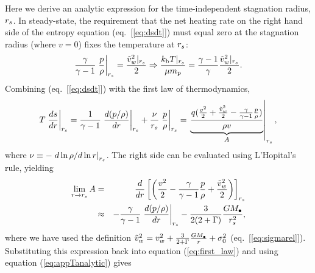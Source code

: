 Here we derive an analytic expression for the time-independent stagnation radius, $r_s$.  In steady-state, the requirement that the net heating rate on the right hand side of the entropy equation (eq.~[\ref{eq:dsdt}]) 
must equal zero at the stagnation radius (where $v = 0$) fixes the temperature at $r_s$:
\begin{align}
 \frac{\gamma}{\gamma-1} \left.\frac{p}{\rho}\right|_{r_s}=\frac{\tilde{v}_{w}^{2}|_{r_s}}{2} \Rightarrow \frac{k_{\rm b} T|_{r_s}}{\mu m_{\rm p}}=\frac{\gamma-1}{\gamma} \frac{\tilde{v}_{w}^{2}|_{r_s}}{2} .
\label{eq:appTanalytic}
\end{align}
Combining (eq.~[\ref{eq:dsdt}]) with the first law of thermodynamics,
\begin{align}
T\left.\frac{d s}{d r}\right|_{r_s} = \frac{1}{\gamma-1}\left.\frac{d (p/\rho)}{d r}\right|_{r_s}+\frac{\nu}{r_s}  \left.\frac{p}{\rho}\right|_{r_s}=\left.\underbrace{\frac{q (\frac{v^2}{2}+\frac{\tilde{v}_{w}^2}{2}-\frac{\gamma}{\gamma-1} \frac{p}{\rho})}{\rho  v}}_{A}\right|_{r_s}, 
 \label{eq:first_law}
\end{align}
where $\nu\equiv -\left.d\ln\rho/d\ln r\right|_{r_s}$.  The right side can be evaluated using L'Hopital's rule, yielding
\begin{align}
  \lim_{r \rightarrow r_s} A &=& \frac{d}{dr} \left[\left(\frac{v^2}{2} -\frac{\gamma}{\gamma-1} \frac{p}{\rho}+\frac{\tilde{v}_{w}^2}{2}\right)\right]_{r_s} \nonumber \\
&\approx& -\frac{\gamma}{\gamma-1}
\left.\frac{d (p/\rho)}{d r}\right|_{r_s}-\frac{3}{2(2+\Gamma)} \frac{G M_{\bullet}}{r_s^2},
\end{align}
where we have used the definition $\tilde{v}_{w}^2=v_{w}^2+ \frac{3}{2+\Gamma} \frac{G M_{\bullet}}{r} +
\sigma_0^2$ (eq.~[\ref{eq:sigmarel}]).  Substituting this expression back into equation (\ref{eq:first_law}) and using equation (\ref{eq:appTanalytic}) gives
